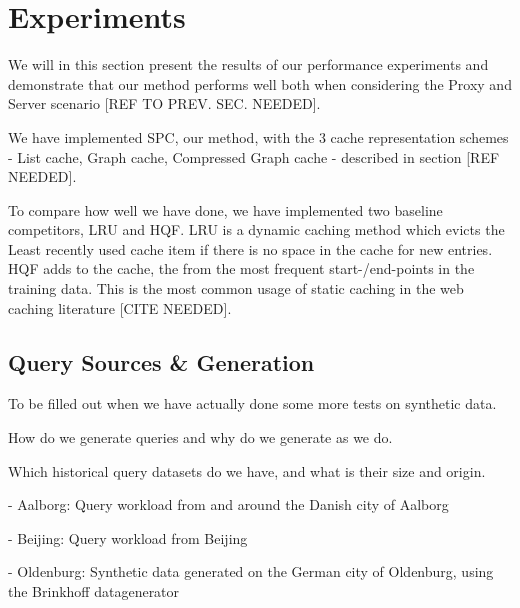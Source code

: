 \section{Experiments}

We will in this section present the results of our performance experiments and demonstrate that our method performs well both when considering the Proxy and Server scenario [REF TO PREV. SEC. NEEDED]. 

We have implemented SPC, our method, with the 3 cache representation schemes - List cache, Graph cache, Compressed Graph cache - described in section [REF NEEDED].

To compare how well we have done, we have implemented two baseline competitors, LRU and HQF. LRU is a dynamic caching method which evicts the Least recently used cache item if there is no space in the cache for new entries. HQF adds to the cache, the \spaths from the most frequent start-/end-points in the training data. This is the most common usage of static caching in the web caching literature [CITE NEEDED].






\subsection{Query Sources \& Generation}

To be filled out when we have actually done some more tests on synthetic data. 

How do we generate queries and why do we generate as we do.

Which historical query datasets do we have, and what is their size and origin.

- Aalborg: Query workload from and around the Danish city of Aalborg

- Beijing: Query workload from Beijing

- Oldenburg: Synthetic data generated on the German city of Oldenburg, using the Brinkhoff datagenerator \cite{brinkhoff} 



